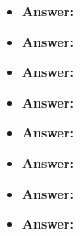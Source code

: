 \begin{itemize}
\item 
{\bf Answer:}

\item 
{\bf Answer:}

\item 
{\bf Answer:}

\item 
{\bf Answer:}

\item 
{\bf Answer:}

\item 
{\bf Answer:}

\item 
{\bf Answer:}

\item 
{\bf Answer:}


\end{itemize}





